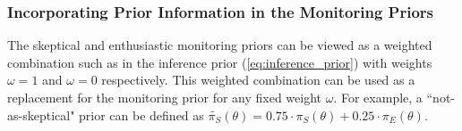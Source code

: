 \documentclass[12pt]{article}
\begin{document}
%

\subsubsection{Incorporating Prior Information in the Monitoring Priors}
The skeptical and enthusiastic monitoring priors can be viewed as a weighted combination such as in the inference prior (\ref{eq:inference_prior}) with weights $\omega=1$ and $\omega=0$ respectively. This weighted combination can be used as a replacement for the monitoring prior for any fixed weight $\omega$. For example, a ``not-as-skeptical" prior can be defined as $\tilde{\pi_S}(\theta)=0.75\cdot\pi_S(\theta)+0.25\cdot\pi_E(\theta)$. 
\end{document}
